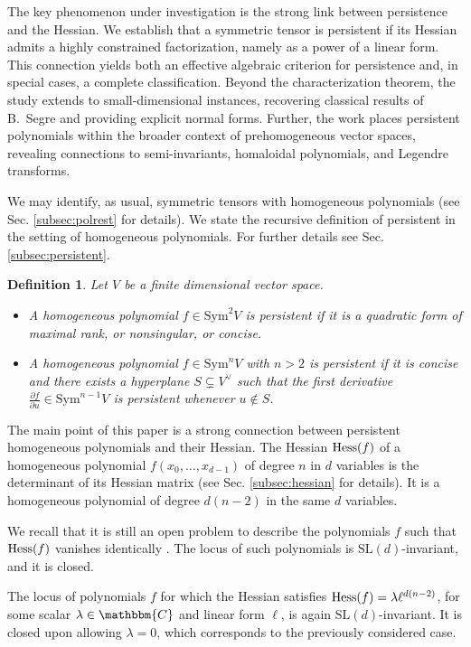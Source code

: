\documentclass[aps,floatfix,groupedaddress,superscriptaddress,longbibliography,footinbib,notitlepage,showpacs]{revtex4-1}
\def\Hess{{\rm Hess}}
\newtheorem{definition}[theorem]{Definition}
\begin{document}
The key phenomenon under investigation is the strong link between persistence and the Hessian. We establish that a symmetric tensor is persistent if its Hessian admits a highly constrained factorization, namely as a power of a linear form. This connection yields both an effective algebraic criterion for persistence and, in special cases, a complete classification. Beyond the characterization theorem, the study extends to small-dimensional instances, recovering classical results of B.~Segre and providing explicit normal forms. Further, the work places persistent polynomials within the broader context of prehomogeneous vector spaces, revealing connections to semi-invariants, homaloidal polynomials, and Legendre transforms.

We may identify, as usual, symmetric tensors with homogeneous polynomials (see Sec. \ref{subsec:polrest} for details). 
We state the recursive definition of persistent in the setting of homogeneous polynomials. For further details see Sec. \ref{subsec:persistent}.
\begin{definition}\label{def:persistent-symtensor_intro}
Let $V$ be a finite dimensional vector space.
\begin{itemize}
\item[(i)] A homogeneous polynomial $f\in \mathrm{Sym}^2V$ is persistent if it is a quadratic form of maximal rank, or nonsingular, or concise.
\item[(ii)] A homogeneous polynomial $f\in \mathrm{Sym}^nV$ with $n > 2$ is persistent if it is concise and there exists a hyperplane $S \subsetneq V^\vee$ such that the first derivative $\frac{\partial f}{\partial u}\in \mathrm{Sym}^{n-1}V$ is persistent whenever $u\notin S$. 
\end{itemize}
\end{definition}
The main point of this paper is a strong connection between persistent homogeneous polynomials and their Hessian. The Hessian $\Hess(f)$ of a homogeneous polynomial $f(x_0,\ldots, x_{d-1})$ of degree $n$ in $d$ variables is the determinant of its Hessian matrix (see Sec. \ref{subsec:hessian} for details). It is a homogeneous polynomial of degree $d(n-2)$ in the same $d$ variables.  

We recall that it is still an open problem to describe the polynomials $f$ such that $\Hess(f)$ vanishes identically \cite{Ru}. The locus of such polynomials is $\mathrm{SL}(d)$-invariant, and it is closed.

The locus of polynomials \(f\) for which the Hessian satisfies $\Hess(f)=\lambda \ell^{d(n-2)}$, for some scalar $\lambda\in\mathbbm{C}$ and linear form $\ell$, is again 
$\mathrm{SL}(d)$-invariant. It is closed upon allowing $\lambda=0$, which corresponds to the previously considered case.
\end{document}
